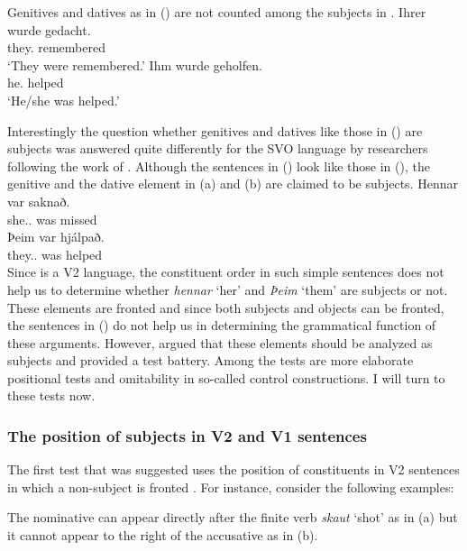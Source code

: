 Genitives and datives as in () are not counted among the subjects in .
\eal
\ex 
\gll Ihrer       wurde gedacht.\\
     they.\GEN{} \AUX{} remembered\\\german
\glt `They were remembered.'
\ex 
\gll Ihm       wurde  geholfen.\\
     he.\DAT{} \AUX{} helped\\
\glt `He/she was helped.'
\zl

\noindent
Interestingly the question whether genitives and datives like those in () are subjects was
answered quite differently for the SVO language  by researchers following the work of
\citet*{ZMT85a}. Although the sentences in () look like those in (), the genitive and
the dative element in (a) and (b) are claimed to be subjects.
\eal
\label{ex-subject-icelandic-passive-v2}
\ex 
\gll Hennar var saknað.\\
     she.\SG.\GEN{} was missed\\\icelandic
\ex 
\gll Þeim            var hjálpað.\\
     they.\PL.\DAT{} was helped\\
\zl
Since  is a V2 language, the constituent order in such simple sentences does not help us to
determine whether \emph{hennar} `her' and \emph{Þeim} `them' are subjects or not. These elements are
fronted and since both subjects and objects can be fronted, the sentences in () do not help
us in determining the grammatical function of these arguments. However, \citet*{ZMT85a} argued that
these elements should be analyzed as subjects and provided a test battery. Among the tests are more
elaborate positional tests and omitability in so-called control constructions. I will turn to these
tests now.


\subsubsection{The position of subjects in V2 and V1 sentences}


The first test that was suggested uses the position of constituents in V2 sentences in which a
non-subject is fronted \citep*[Section~2.3]{ZMT85a}. For instance, consider the following examples:

\eal
\zl
The nominative can appear directly after the finite verb \emph{skaut} `shot' as in (a) but it
cannot appear to the right of the accusative as in (b).

